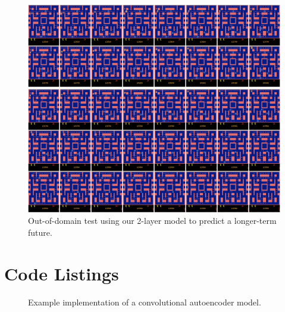 \begin{figure}[htpb]
	\centering
	\includegraphics[width=1.0\linewidth]{figures/pred/pac/full-long/pred-00.png} 
	\caption[Long-Term Prediction on MsPacman]{Out-of-domain test using our 2-layer model to predict a longer-term future.} \label{fig:pac-pred-full-long}
\end{figure}


\clearpage
\section{Code Listings}

\begin{figure}[h!tb]
  
  \caption[Code: Convolutional Autoencoder]{Example implementation of a convolutional autoencoder model.}\label{code:model}
\end{figure}

